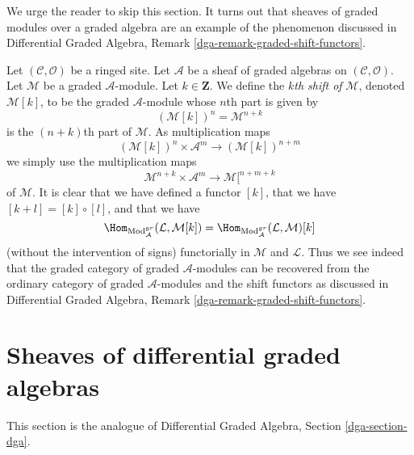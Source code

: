 \noindent
We urge the reader to skip this section. It turns out that sheaves
of graded modules over a graded algebra are an example of the phenomenon
discussed in
Differential Graded Algebra, Remark \ref{dga-remark-graded-shift-functors}.

\medskip\noindent
Let $(\mathcal{C}, \mathcal{O})$ be a ringed site.
Let $\mathcal{A}$ be a sheaf of graded algebras
on $(\mathcal{C}, \mathcal{O})$.
Let $\mathcal{M}$ be a graded $\mathcal{A}$-module. Let $k \in \mathbf{Z}$.
We define the {\it $k$th shift of} $\mathcal{M}$, denoted $\mathcal{M}[k]$,
to be the graded $\mathcal{A}$-module whose $n$th part is given by
$$
(\mathcal{M}[k])^n = \mathcal{M}^{n + k}
$$
is the $(n + k)$th part of $\mathcal{M}$. As multiplication maps
$$
(\mathcal{M}[k])^n \times \mathcal{A}^m
\longrightarrow
(\mathcal{M}[k])^{n + m}
$$
we simply use the multiplication maps
$$
\mathcal{M}^{n + k} \times \mathcal{A}^m
\longrightarrow
\mathcal{M}[^{n + m + k}
$$
of $\mathcal{M}$. It is clear that we have defined a functor $[k]$,
that we have $[k + l] = [k] \circ [l]$, and that we have
$$
\Hom_{\text{Mod}^{gr}_\mathcal{A}}(\mathcal{L}, \mathcal{M}[k]) =
\Hom_{\text{Mod}^{gr}_\mathcal{A}}(\mathcal{L}, \mathcal{M})[k]
$$
(without the intervention of signs)
functorially in $\mathcal{M}$ and $\mathcal{L}$.
Thus we see indeed that the graded category of graded $\mathcal{A}$-modules
can be recovered from the ordinary category of graded $\mathcal{A}$-modules
and the shift functors as discussed in 
Differential Graded Algebra, Remark \ref{dga-remark-graded-shift-functors}.








\section{Sheaves of differential graded algebras}
\label{section-dga}

\noindent
This section is the analogue of
Differential Graded Algebra, Section \ref{dga-section-dga}.


